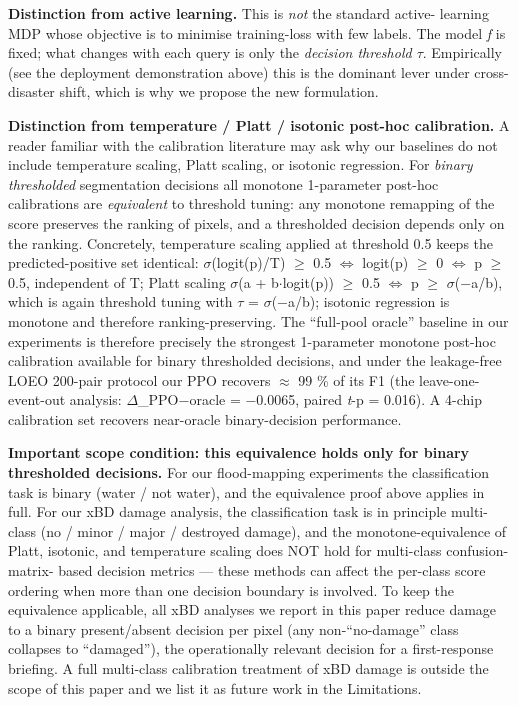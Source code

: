 \documentclass[sn-nature,lineno]{sn-jnl}
\theoremstyle{thmstyleone}
\theoremstyle{thmstyletwo}
\theoremstyle{thmstylethree}
\begin{document}
\textbf{Distinction from active learning.} This is \emph{not} the standard active-
learning MDP whose objective is to minimise training-loss with few labels.
The model \emph{f} is fixed; what changes with each query is only the
\emph{decision threshold $\tau$}. Empirically (see the deployment demonstration above) this is the dominant lever
under cross-disaster shift, which is why we propose the new formulation.

\textbf{Distinction from temperature / Platt / isotonic post-hoc calibration.} A
reader familiar with the calibration literature may ask why our baselines do
not include temperature scaling, Platt scaling, or isotonic regression. For
\emph{binary thresholded} segmentation decisions all monotone 1-parameter
post-hoc calibrations are \emph{equivalent} to threshold tuning: any monotone
remapping of the score preserves the ranking of pixels, and a thresholded
decision depends only on the ranking. Concretely, temperature scaling
applied at threshold 0.5 keeps the predicted-positive set identical:
$\sigma$(logit(p)/T) $\geq$ 0.5 $\Leftrightarrow$ logit(p) $\geq$ 0 $\Leftrightarrow$ p $\geq$ 0.5, independent of T; Platt
scaling $\sigma$(a + b$\cdot$logit(p)) $\geq$ 0.5 $\Leftrightarrow$ p $\geq$ $\sigma$($-$a/b), which is again threshold
tuning with $\tau$ = $\sigma$($-$a/b); isotonic regression is monotone and therefore
ranking-preserving. The ``full-pool oracle'' baseline in our experiments is
therefore precisely the strongest 1-parameter monotone post-hoc calibration
available for binary thresholded decisions, and under the leakage-free
LOEO 200-pair protocol our PPO recovers $\approx$ 99 \% of its F1 (the leave-one-event-out analysis:
$\Delta$\_PPO$-$oracle = $-$0.0065, paired \emph{t}-p = 0.016). A 4-chip
calibration set recovers near-oracle binary-decision performance.

\textbf{Important scope condition: this equivalence holds only for binary
thresholded decisions.} For our flood-mapping experiments the
classification task is binary (water / not water), and the equivalence
proof above applies in full. For our xBD damage analysis, the
classification task is in principle multi-class (no / minor / major /
destroyed damage), and the monotone-equivalence of Platt, isotonic, and
temperature scaling does NOT hold for multi-class confusion-matrix-
based decision metrics --- these methods can affect the per-class score
ordering when more than one decision boundary is involved. To keep the
equivalence applicable, all xBD analyses we report in this paper
reduce damage to a binary present/absent decision per pixel (any
non-``no-damage'' class collapses to ``damaged''), the operationally
relevant decision for a first-response briefing. A full multi-class
calibration treatment of xBD damage is outside the scope of this paper
and we list it as future work in the Limitations.
\end{document}
